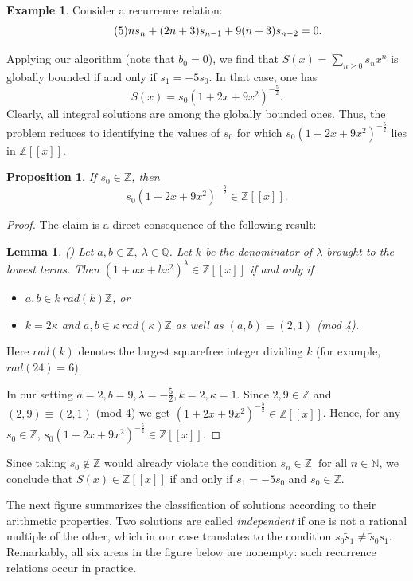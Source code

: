 \documentclass[11pt]{article}
\theoremstyle{definition}
\newtheorem*{ex}{Example}
\theoremstyle{plain}
\newtheorem{lem}[defi]{Lemma}
\newtheorem{prop}[defi]{Proposition}
\theoremstyle{remark}
\begin{document}
\begin{ex} Consider a recurrence relation:
\begin{equation}\label{eq:{5}}\tag{5}
ns_n+(2n+3)s_{n-1}+9(n+3)s_{n-2}=0.
\end{equation}

Applying our algorithm (note that $b_0=0$), we find that $S(x) = \sum\limits_{n \geq 0}s_nx^n$ is globally bounded if and only if $s_1 = -5s_0$. In that case, one has
\[S(x) = s_0(1+2x+9x^2)^{-\frac{5}{2}}.\]
Clearly, all integral solutions are among the globally bounded ones. Thus, the problem reduces to identifying the values of $s_0$ for which $s_0(1+2x+9x^2)^{-\frac{5}{2}}$ lies in $\mathbb{Z}[[x]]$. 
\begin{prop}
If $s_0\in\mathbb{Z}$, then
\[s_0(1+2x+9x^2)^{-\frac{5}{2}}\in\mathbb{Z}[[x]].\]
\end{prop}
\begin{proof}
The claim is a direct consequence of the following result:
\begin{lem}(\cite[Example 1.8]{PS24})
Let $a,b \in \mathbb{Z}, \ \lambda \in \mathbb{Q}$. Let $k$ be the denominator of $\lambda$ brought to the lowest terms. Then $(1+ax+bx^2)^\lambda \in \mathbb{Z}[[x]]$ if and only if
\begin{itemize}
\item $a,b \in k \ rad(k) \mathbb{Z}$, or
\item $k = 2\kappa$ and $a,b \in \kappa \ rad(\kappa) \mathbb{Z}$ as well as $(a,b) \equiv (2,1)$ (mod 4).
\end{itemize}
\end{lem}
Here $rad(k)$ denotes the largest squarefree integer dividing $k$ (for example, $rad(24) = 6$).

In our setting $a = 2, b = 9, \lambda = -\frac{5}{2}, k = 2, \kappa = 1$. Since $2,9 \in \mathbb{Z}$ and $(2,9) \equiv (2,1)$ (mod 4) we get $(1+2x+9x^2)^{-\frac{5}{2}} \in \mathbb{Z}[[x]]$. Hence, for any $s_0 \in \mathbb{Z}$, $s_0(1+2x+9x^2)^{-\frac{5}{2}} \in \mathbb{Z}[[x]]$. 
\end{proof}

Since taking $s_0 \notin \mathbb{Z}$ would already violate the condition $s_n \in \mathbb{Z} \ \text{ for all } n \in \mathbb{N}$, we conclude that $S(x) \in \mathbb{Z}[[x]]$ if and only if $s_1 = -5s_0$ and $s_0 \in \mathbb{Z}$.
\end{ex}

The next figure summarizes the classification of solutions according to their arithmetic properties. Two solutions are called \emph{independent} if one is not a rational multiple of the other, which in our case translates to the condition $s_0\tilde{s}_1 \neq \tilde{s}_0s_1$. Remarkably, all six areas in the figure below are nonempty: such recurrence relations occur in practice.
\end{document}

